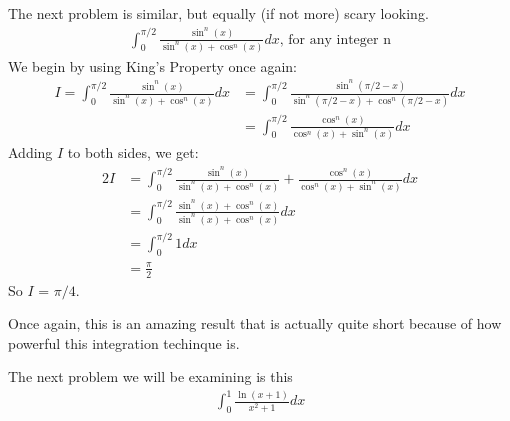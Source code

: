 \documentclass[12pt]{article}
\theoremstyle{definition}
\theoremstyle{remark}
\begin{document}
    The next problem is similar, but equally (if not more) scary looking.
    \begin{align*}
        \int_{0}^{\pi/2} \frac{\sin^n(x)}{\sin^n(x) + \cos^n(x)}dx \text{, for any integer n}
    \end{align*}
    We begin by using King's Property once again:
    \begin{align*}
        I = \int_{0}^{\pi/2} \frac{\sin^n(x)}{\sin^n(x) + \cos^n(x)}dx &= \int_{0}^{\pi/2} \frac{\sin^n(\pi/2 - x)}{\sin^n(\pi/2 - x) + \cos^n(\pi/2 - x)}dx \\ 
        &= \int_{0}^{\pi/2} \frac{\cos^n(x)}{\cos^n(x) + \sin^n(x)}dx
    \end{align*}
    Adding $I$ to both sides, we get:
    \begin{align*}
        2I &= \int_{0}^{\pi/2} \frac{\sin^n(x)}{\sin^n(x) + \cos^n(x)} + \frac{\cos^n(x)}{\cos^n(x) + \sin^n(x)}dx \\ 
        &= \int_{0}^{\pi/2} \frac{\sin^n(x) + \cos^n(x)}{\sin^n(x) + \cos^n(x)}dx \\ 
        &= \int_{0}^{\pi/2} 1dx \\ 
        &= \frac{\pi}{2}
    \end{align*}
    So $I$ = $\pi/4$.
    
    Once again, this is an amazing result that is actually quite short because of how powerful this integration techinque is.

    The next problem we will be examining is this
    \begin{align*}
        \int_{0}^{1} \frac{\ln(x+1)}{x^2+1}dx
    \end{align*}
\end{document}

